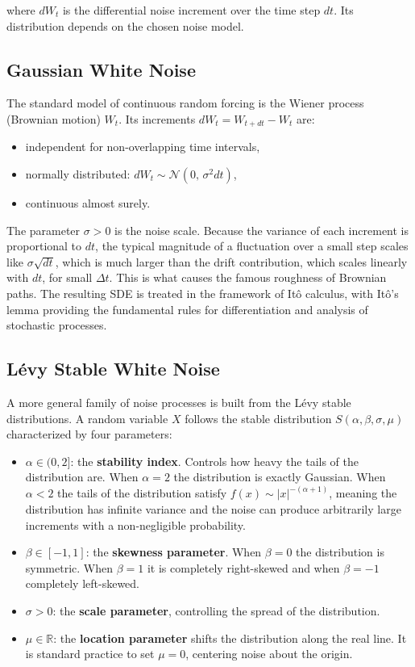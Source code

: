 \documentclass[12pt]{article}
\begin{document}
where $dW_t$ is the differential noise increment over the time step $dt$.
Its distribution depends on the chosen noise model.

\subsection{Gaussian White Noise}

The standard model of continuous random forcing is the Wiener process
(Brownian motion) $W_t$. Its increments $dW_t = W_{t+dt} - W_t$ are:

\begin{itemize}
    \item independent for non-overlapping time intervals,
    \item normally distributed: $dW_t \sim \mathcal{N}(0,\, \sigma^2 dt)$,
    \item continuous almost surely.
\end{itemize}

The parameter $\sigma > 0$ is the noise scale. Because the variance of each
increment is proportional to $dt$, the typical magnitude of a fluctuation
over a small step scales like $\sigma\sqrt{dt}$, which is much larger than
the drift contribution, which scales linearly with $dt$, for small $\Delta t$. This is what causes the famous roughness of Brownian paths.
The resulting SDE is treated in the framework of It\^{o} calculus, with It\^{o}'s lemma providing the fundamental rules for differentiation and analysis of stochastic processes.

\subsection{L\'{e}vy Stable White Noise}

A more general family of noise processes is built from the L\'{e}vy stable
distributions. A random variable $X$ follows the stable distribution
$S(\alpha, \beta, \sigma, \mu)$ characterized by four parameters:

\begin{itemize}
    \item $\alpha \in (0, 2]$: the \textbf{stability index}. Controls how
        heavy the tails of the distribution are. When $\alpha = 2$ the
        distribution is exactly Gaussian. When $\alpha < 2$ the tails of the distribution satisfy $f(x) \sim |x|^{-(\alpha+1)}$, meaning the distribution
        has infinite variance and the noise can produce arbitrarily large
        increments with a non-negligible probability.
    \item $\beta \in [-1, 1]$: the \textbf{skewness parameter}. When $\beta = 0$
        the distribution is symmetric. When $\beta = 1$ it is completely
        right-skewed and when $\beta = -1$ completely left-skewed.
    \item $\sigma > 0$: the \textbf{scale parameter}, controlling the spread
        of the distribution.
    \item $\mu \in \mathbb{R}$: the \textbf{location parameter} shifts the distribution along the real line. It is standard practice to set $\mu = 0$, centering noise about the origin.
\end{itemize}
\end{document}
